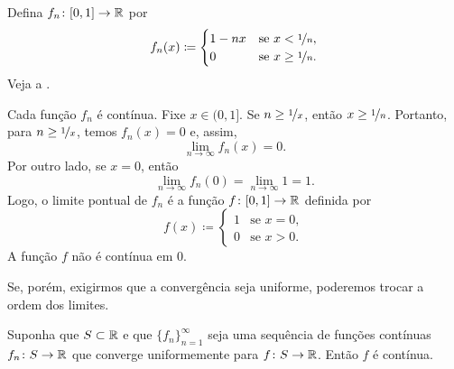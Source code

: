 \begin{example}
Defina $f_n \colon [0,1] \to {\mathbb{R}}$ por
\begin{equation*}
f_n(x) \coloneqq
\begin{cases}
1-nx &  \text{se } x < \nicefrac{1}{n},\\
0 &  \text{se } x \geq \nicefrac{1}{n}.
\end{cases}
\end{equation*}
Veja a .

\begin{myfigureht}
\caption{Gráfico de $f_n(x)$.%
\label{contconvcntr:fig}}
\end{myfigureht}

Cada função $f_n$ é contínua.
Fixe $x \in (0,1]$. Se $n \geq \nicefrac{1}{x}$, então
$x \geq \nicefrac{1}{n}$. Portanto, para $n \geq \nicefrac{1}{x}$,
temos $f_n(x) = 0$ e, assim,
\begin{equation*}
\lim_{n \to \infty} f_n(x) = 0.
\end{equation*}
Por outro lado, se $x=0$, então
\begin{equation*}
\lim_{n \to \infty} f_n(0) = 
\lim_{n \to \infty} 1 = 1.
\end{equation*}
Logo, o limite pontual de $f_n$ é a função
$f \colon [0,1] \to {\mathbb{R}}$ definida por
\begin{equation*}
f(x) \coloneqq
\begin{cases}
1 &  \text{se } x = 0,\\
0 &  \text{se } x > 0.
\end{cases}
\end{equation*}
A função $f$ não é contínua em 0.
\end{example}

Se, porém, exigirmos que a convergência seja uniforme, poderemos trocar a
ordem dos limites.

\begin{thm}
Suponha que $S \subset {\mathbb{R}}$ e que $\{ f_n \}_{n=1}^\infty$ seja uma
sequência de funções contínuas $f_n \colon S \to {\mathbb{R}}$ que converge
uniformemente para $f \colon S \to {\mathbb{R}}$. Então $f$ é contínua.
\end{thm}


